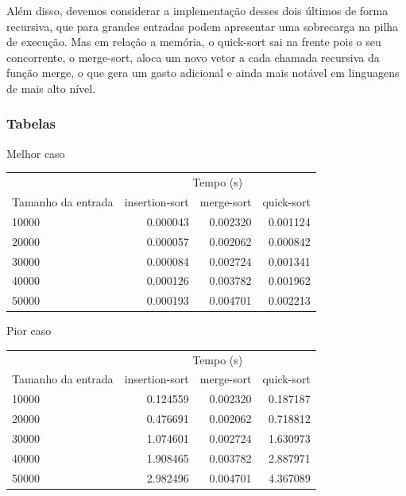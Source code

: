 Além disso, devemos considerar a implementação desses dois últimos de forma recursiva, que para grandes entradas podem apresentar uma sobrecarga na pilha de execução. Mas em relaçâo a memória, o quick-sort sai na frente pois o seu concorrente, o merge-sort, aloca um novo vetor a cada chamada recursiva da função merge, o que gera um gasto adicional e ainda mais notável em linguagens de mais alto nível.


\newpage
\subsubsection{Tabelas}

\centering
\caption{Melhor caso}
\begin{center}
\begin{tabular}{| l | r | r | r |}
\hline
& \multicolumn{3}{c|}{Tempo (s)}\\
\cline{2 - 4}
Tamanho da entrada & insertion-sort & merge-sort & quick-sort \\
\hline
10000 & 0.000043 & 0.002320 & 0.001124\\
20000 & 0.000057 & 0.002062 & 0.000842\\
30000 & 0.000084 & 0.002724 & 0.001341\\
40000 & 0.000126 & 0.003782 & 0.001962\\
50000 & 0.000193 & 0.004701 & 0.002213\\
\hline
\end{tabular}
\end{center}

\centering
\caption{Pior caso}
\begin{center}
\begin{tabular}{| l | r | r | r |}
\hline
& \multicolumn{3}{c|}{Tempo (s)}\\
\cline{2 - 4}
Tamanho da entrada & insertion-sort & merge-sort & quick-sort \\
\hline
10000 & 0.124559 & 0.002320 & 0.187187\\
20000 & 0.476691 & 0.002062 & 0.718812\\
30000 & 1.074601 & 0.002724 & 1.630973\\
40000 & 1.908465 & 0.003782 & 2.887971\\
50000 & 2.982496 & 0.004701 & 4.367089\\
\hline
\end{tabular}
\end{center}

